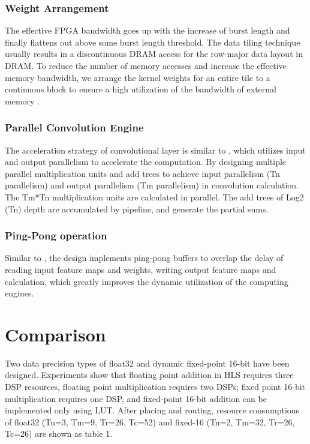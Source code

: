 \subsubsection{Weight Arrangement}
The effective FPGA bandwidth goes up with the increase of burst length and finally flattens out above some burst length threshold\cite{zhang2016caffeine}. The data tiling technique usually results in a discontinuous DRAM access for the row-major data layout in DRAM. To reduce the number of memory accesses and increase the effective memory bandwidth, we arrange the kernel weights for an entire tile to a continuous block to ensure a high utilization of the bandwidth of external memory \cite{qiu2016going}.

\subsubsection{Parallel Convolution Engine}
The acceleration strategy of convolutional layer is similar to \cite{zhang2015optimizing, motamedi2017placid}, which utilizes input and output parallelism to accelerate the computation. By designing multiple parallel multiplication units and add trees to achieve input parallelism (Tn parallelism) and output parallelism (Tm parallelism) in convolution calculation. The Tm*Tn multiplication units are calculated in parallel. The add trees of Log2 (Tn) depth are accumulated by pipeline, and generate the partial sums.

\subsubsection{Ping-Pong operation}
Similar to \cite{zhang2015optimizing}, the design implements ping-pong buffers to overlap the delay of reading input feature maps and weights, writing output feature maps and calculation, which greatly improves the dynamic utilization of the computing engines.

\section{Comparison}
Two data precision types of float32 and dynamic fixed-point 16-bit have been designed. Experiments show that floating point addition in HLS requires three DSP resources, floating point multiplication requires two DSPs; fixed point 16-bit multiplication requires one DSP, and fixed-point 16-bit addition can be implemented only using LUT. After placing and routing, resource consumptions of float32 (Tn=3, Tm=9, Tr=26, Tc=52) and fixed-16 (Tn=2, Tm=32, Tr=26, Tc=26) are shown as table 1.

